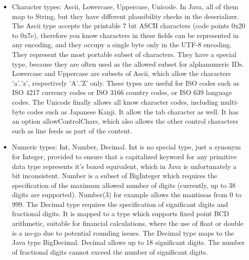 \documentclass[11pt,a4paper,oneside]{article}
\begin{document}
\begin{itemize}
  \item Character types:  {\ttfamily Ascii}, {\ttfamily Lowercase}, {\ttfamily Uppercase}, {\ttfamily Unicode}. In Java, all of them map to {\ttfamily String},
   but they have different plausibility checks in the deserializer. The {\ttfamily Ascii} type accepts the printable 7 bit ASCII characters
    (code points 0x20 to 0x7e), therefore you know characters in these fields can be represented in any encoding, and they
    occupy a single byte only in the UTF-8 encoding. They represent the most portable subset of characters. They have a special type, because they are often used as the allowed subset for
      alphanumeric IDs. {\ttfamily Lowercase} and {\ttfamily Uppercase} are subsets of {\ttfamily Ascii}, which allow the characters {\ttfamily 'a'..'z'},
      respectively {\ttfamily 'A'..'Z'} only. These types are useful for ISO codes such as ISO 4217 currency codes or ISO 3166
      country codes, or ISO 639 language codes.
      The {\ttfamily Unicode} finally allows all know character codes, including multi-byte codes such as Japanese Kanji. It
      allow the tab character as well.
      It has an option {\ttfamily allowControlChars}, which also allows the other control characters such as line feeds as part of the content.
  \item Numeric types: {\ttfamily Int}, {\ttfamily Number}, {\ttfamily Decimal}.  {\ttfamily Int} is no special type, just a synonym for {\ttfamily Integer},
      provided to ensure that a capitalized keyword for any primitive data type represents it's boxed equivalent, which in Java is unfortunately a bit inconsistent.
      {\ttfamily Number} is a subset of {\ttfamily BigInteger} which requires the specification of the maximum allowed number of
      digits (currently, up to 38 digits are supported). {\ttfamily Number(3)} for example allows the mantissas from 0 to 999.
      The {\ttfamily Decimal} type requires the specification of significant digits and fractional digits. It is mapped to a type which supports fixed point BCD arithmetic, suitable for
      financial calculations, where the use of {\ttfamily float} or {\ttfamily double} is a no-go due to potential rounding issues. The {\ttfamily Decimal} type
      maps to the Java type BigDecimal. {\ttfamily Decimal} allows up to 18 significant digits. The number of fractional digits cannot exceed the number of significant digits.


\end{itemize}
\end{document}
